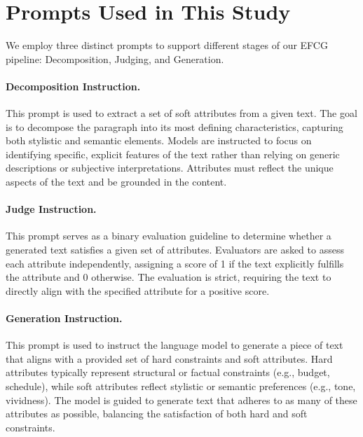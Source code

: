 \section{Prompts Used in This Study}
We employ three distinct prompts to support different stages of our EFCG pipeline: Decomposition, Judging, and Generation.

\paragraph{Decomposition Instruction.}

This prompt is used to extract a set of soft attributes from a given text. The goal is to decompose the paragraph into its most defining characteristics, capturing both stylistic and semantic elements. Models are instructed to focus on identifying specific, explicit features of the text rather than relying on generic descriptions or subjective interpretations. Attributes must reflect the unique aspects of the text and be grounded in the content. 

\paragraph{Judge Instruction.}

This prompt serves as a binary evaluation guideline to determine whether a generated text satisfies a given set of attributes. Evaluators are asked to assess each attribute independently, assigning a score of 1 if the text explicitly fulfills the attribute and 0 otherwise. The evaluation is strict, requiring the text to directly align with the specified attribute for a positive score.

\paragraph{Generation Instruction.}

This prompt is used to instruct the language model to generate a piece of text that aligns with a provided set of hard constraints and soft attributes. Hard attributes typically represent structural or factual constraints (e.g., budget, schedule), while soft attributes reflect stylistic or semantic preferences (e.g., tone, vividness). The model is guided to generate text that adheres to as many of these attributes as possible, balancing the satisfaction of both hard and soft constraints.


